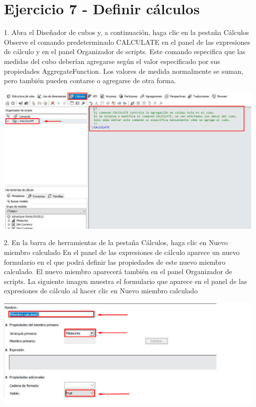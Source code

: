 \section{Ejercicio 7 - Definir cálculos}  

1. Abra el Diseñador de cubos y, a continuación, haga clic en la pestaña Cálculos
Observe el comando predeterminado CALCULATE en el panel de las expresiones de cálculo y en el panel
Organizador de scripts. Este comando especifica que las medidas del cubo deberían agregarse según el valor
especificado por sus propiedades AggregateFunction. Los valores de medida normalmente se suman, pero
también pueden contarse o agregarse de otra forma.

	\begin{center}
	\includegraphics[width=\columnwidth]{images/task7/img1}
	\end{center}	

2. En la barra de herramientas de la pestaña Cálculos, haga clic en Nuevo miembro calculado
En el panel de las expresiones de cálculo aparece un nuevo formulario en el que podrá definir las propiedades de
este nuevo miembro calculado. El nuevo miembro aparecerá también en el panel Organizador de scripts. La siguiente imagen muestra el formulario que aparece en el panel de las expresiones de cálculo al hacer clic en Nuevo miembro calculado

	\begin{center}
	\includegraphics[width=\columnwidth]{images/task7/img2}
	\end{center}	

